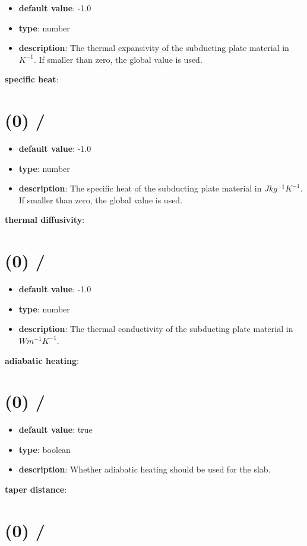 \begin{itemize}[leftmargin=0em]\item {\bf default value}: -1.0
\item {\bf type}: number
\item {\bf description}: The thermal expansivity of the subducting plate material in $K^{-1}$. If smaller than zero, the global value is used.
\end{itemize}\item {\bf specific heat}: \section{(0) /}
\begin{itemize}[leftmargin=0em]\item {\bf default value}: -1.0
\item {\bf type}: number
\item {\bf description}: The specific heat of the subducting plate material in $J kg^{-1} K^{-1}$. If smaller than zero, the global value is used.
\end{itemize}\item {\bf thermal diffusivity}: \section{(0) /}
\begin{itemize}[leftmargin=0em]\item {\bf default value}: -1.0
\item {\bf type}: number
\item {\bf description}: The thermal conductivity of the subducting plate material in $W m^{-1} K^{-1}$.
\end{itemize}\item {\bf adiabatic heating}: \section{(0) /}
\begin{itemize}[leftmargin=0em]\item {\bf default value}: true
\item {\bf type}: boolean
\item {\bf description}: Whether adiabatic heating should be used for the slab.
\end{itemize}\item {\bf taper distance}: \section{(0) /}
